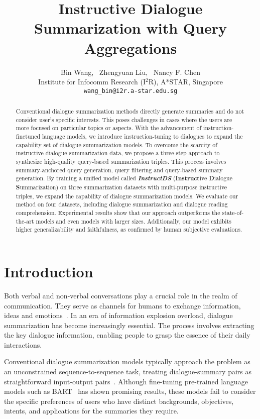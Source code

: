 \documentclass[11pt]{article}
\title{Instructive Dialogue Summarization with Query Aggregations}
\author{
Bin Wang,
\  Zhengyuan Liu,
\  Nancy F. Chen \\
Institute for Infocomm Research (I$^2$R), A*STAR, Singapore\\
\texttt{wang\_bin@i2r.a-star.edu.sg}
}
\begin{document}
\maketitle
\begin{abstract}

    Conventional dialogue summarization methods directly generate summaries and do not consider user's specific interests. This poses challenges in cases where the users are more focused on particular topics or aspects. With the advancement of instruction-finetuned language models, we introduce instruction-tuning to dialogues to expand the capability set of dialogue summarization models. To overcome the scarcity of instructive dialogue summarization data, we propose a three-step approach to synthesize high-quality query-based summarization triples. This process involves summary-anchored query generation, query filtering and query-based summary generation. By training a unified model called \textbf{\emph{InstructDS}} (\textbf{Instruct}ive \textbf{D}ialogue \textbf{S}ummarization) on three summarization datasets with multi-purpose instructive triples, we expand the capability of dialogue summarization models. We evaluate our method on four datasets, including dialogue summarization and dialogue reading comprehension. Experimental results show that our approach outperforms the state-of-the-art models and even models with larger sizes. Additionally, our model exhibits higher generalizability and faithfulness, as confirmed by human subjective evaluations.
    
\end{abstract}

\section{Introduction}

    Both verbal and non-verbal conversations play a crucial role in the realm of communication. They serve as channels for humans to exchange information, ideas and emotions~\cite{kester2004conversation}. In an era of information explosion overload, dialogue summarization has become increasingly essential. The process involves extracting the key dialogue information, enabling people to grasp the essence of their daily interactions. 
    
    Conventional dialogue summarization models typically approach the problem as an unconstrained sequence-to-sequence task, treating dialogue-summary pairs as straightforward input-output pairs~\cite{shang-etal-2018-unsupervised,goo2018abstractive,chen-yang-2020-multi}. Although fine-tuning pre-trained language models such as BART~\cite{lewis-etal-2020-bart} has shown promising results, these models fail to consider the specific preferences of users who have distinct backgrounds, objectives, intents, and applications for the summaries they require.
    
\end{document}
